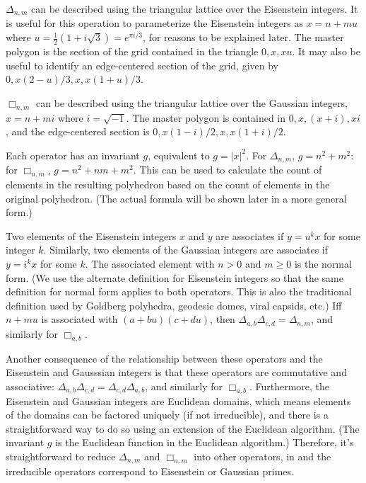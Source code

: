 \documentclass{amsart}[12pt]
\begin{document}
$\Delta_{n,m}$ can be described using the triangular lattice over the
Eisenstein integers. It is useful for this operation to parameterize the
Eisenstein integers as $x = n + mu$ where $u = \frac{1}{2}(1 + i\sqrt 3) =
e^{\pi i/3}$, for reasons to be explained later. The master polygon is the
section of the grid contained in the triangle $0, x, xu$. It may also be useful
to identify an edge-centered section of the grid,
given by $0, x(2-u)/3, x, x(1+u)/3$.

$\Box_{n,m}$ can be described using the triangular lattice over the Gaussian
integers, $x = n + mi$ where $i = \sqrt{-1}$. The master polygon is contained
in $0,x,(x+i),xi$, and the edge-centered section is $0, x(1-i)/2, x, x(1+i)/2$.

Each operator has an invariant $g$, equivalent to $g = |x|^2$. For
$\Delta_{n,m}$, $g = n^2 + m^2$: for $\Box_{n,m}$, $g = n^2 + nm + m^2$. This
can be used to calculate the count of elements in the resulting polyhedron
based on the count of elements in the original polyhedron. (The actual formula
will be shown later in a more general form.)

Two elements of the Eisenstein integers $x$ and $y$ are associates if
$y = u^k x$ for some integer $k$. Similarly, two elements of the Gaussian integers are
associates if $y = i^k x$ for some $k$. The associated element with $n>0$ and
$m\ge 0$ is the normal form. (We use the alternate definition for Eisenstein
integers so that the same definition for normal form applies to both operators.
This is also the traditional definition used by Goldberg polyhedra, geodesic
domes, viral capsids, etc.) Iff $n+mu$ is associated with $(a+bu)(c+du)$, then
$\Delta_{a,b}\Delta_{c,d} = \Delta_{n,m}$, and similarly for $\Box_{a,b}$.

Another consequence of the relationship between these operators and the
Eisenstein and Gausssian integers is that these operators are commutative and
associative: $\Delta_{a,b}\Delta_{c,d} = \Delta_{c,d}\Delta_{a,b}$, and
similarly for $\Box_{a,b}$. Furthermore, the Eisenstein and Gaussian integers
are Euclidean domains, which means elements of the domains can be factored
uniquely (if not irreducible), and there is a straightforward way to do so
using an extension of the Euclidean algorithm. (The invariant $g$ is the
Euclidean function in the Euclidean algorithm.) Therefore, it's straightforward
to reduce $\Delta_{n,m}$ and $\Box_{n,m}$ into other operators, in
and the irreducible operators correspond to Eisenstein or Gaussian primes.
\end{document}
